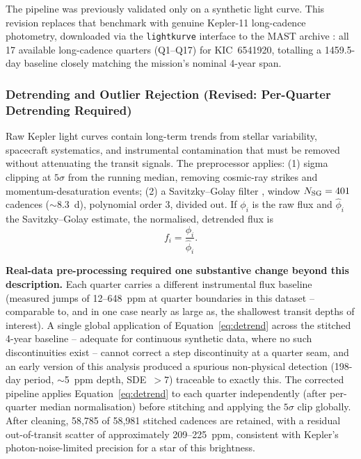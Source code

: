 \documentclass[11pt]{article}
\begin{document}
The pipeline was previously validated only on a synthetic light curve. This revision replaces that benchmark with genuine Kepler-11 long-cadence photometry, downloaded via the \texttt{lightkurve} interface to the MAST archive \citep{Lightkurve2018}: all 17 available long-cadence quarters (Q1--Q17) for KIC~6541920, totalling a 1459.5-day baseline closely matching the mission's nominal 4-year span.

\subsubsection{Detrending and Outlier Rejection (Revised: Per-Quarter Detrending Required)}

Raw Kepler light curves contain long-term trends from stellar variability, spacecraft systematics, and instrumental contamination that must be removed without attenuating the transit signals. The preprocessor applies: (1) sigma clipping at $5\sigma$ from the running median, removing cosmic-ray strikes and momentum-desaturation events; (2) a Savitzky--Golay filter \citep{Savitzky1964}, window $N_{\rm SG}=401$ cadences ($\sim$8.3~d), polynomial order 3, divided out. If $\phi_i$ is the raw flux and $\hat\phi_i$ the Savitzky--Golay estimate, the normalised, detrended flux is
\begin{equation}
f_i = \frac{\phi_i}{\hat\phi_i}.
\label{eq:detrend}
\end{equation}

\textbf{Real-data pre-processing required one substantive change beyond this description.} Each quarter carries a different instrumental flux baseline (measured jumps of 12--648~ppm at quarter boundaries in this dataset -- comparable to, and in one case nearly as large as, the shallowest transit depths of interest). A single global application of Equation~\ref{eq:detrend} across the stitched 4-year baseline -- adequate for continuous synthetic data, where no such discontinuities exist -- cannot correct a step discontinuity at a quarter seam, and an early version of this analysis produced a spurious non-physical detection (198-day period, $\sim$5~ppm depth, SDE~$>7$) traceable to exactly this. The corrected pipeline applies Equation~\ref{eq:detrend} to each quarter independently (after per-quarter median normalisation) before stitching and applying the $5\sigma$ clip globally. After cleaning, 58{,}785 of 58{,}981 stitched cadences are retained, with a residual out-of-transit scatter of approximately 209--225~ppm, consistent with Kepler's photon-noise-limited precision for a star of this brightness.
\end{document}
